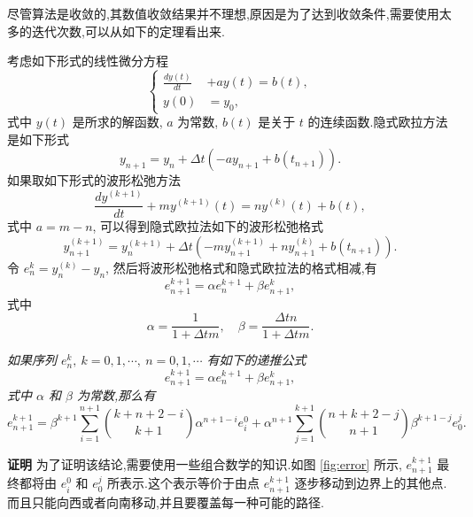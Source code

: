 尽管算法是收敛的,其数值收敛结果并不理想,原因是为了达到收敛条件,需要使用太多的迭代次数,可以从如下的定理看出来.

考虑如下形式的线性微分方程
\begin{equation*}
  \left\{
    \begin{aligned}
      \frac{dy(t)}{dt}&+ay(t)=b(t),\\
      y(0)&=y_{0},
    \end{aligned}
  \right.
\end{equation*}
式中 $y(t)$ 是所求的解函数, $a$ 为常数, $b(t)$ 是关于 $t$ 的连续函数.隐式欧拉方法是如下形式
\begin{equation*}
  y_{n+1}=y_{n}+\Delta t (-a y_{n+1}+b(t_{n+1})).
\end{equation*}
如果取如下形式的波形松弛方法
\begin{equation*}
  \frac{dy^{(k+1)}}{dt}+m y^{(k+1)}(t) = n y^{(k)}(t) + b(t),
\end{equation*}
式中 $a=m-n$, 可以得到隐式欧拉法如下的波形松弛格式
\begin{equation*}
  y_{n+1}^{(k+1)}=y_{n}^{(k+1)}+\Delta t(-m y_{n+1}^{(k+1)}+n y_{n+1}^{(k)} +b(t_{n+1})).
\end{equation*}
令 $e_{n}^{k}=y_{n}^{(k)}-y_{n}$, 然后将波形松弛格式和隐式欧拉法的格式相减,有
\begin{equation*}
  e_{n+1}^{k+1}=\alpha e_{n}^{k+1} + \beta e_{n+1}^{k},
\end{equation*}
式中
\begin{equation*}
  \alpha = \frac{1}{1+\Delta t m}, \quad \beta = \frac{\Delta t n}{1+\Delta t m}.
\end{equation*}

\begin{lemma}\label{lem:error} \emph{如果序列
  $e_{n}^{k},~k =0,1,\cdots,~n=0,1,\cdots$ 有如下的递推公式
  \begin{equation*}
    e_{n+1}^{k+1}=\alpha e_{n}^{k+1} + \beta e_{n+1}^{k},
  \end{equation*}
  式中 $\alpha$ 和 $\beta$ 为常数,那么有
  \begin{equation*}
    e_{n+1}^{k+1}=\beta^{k+1} \sum_{i=1}^{n+1} \binom{k+n+2-i}{k+1} \alpha^{n+1-i}e_{i}^{0} + \alpha^{n+1} \sum_{j=1}^{k+1}\binom{n+k+2-j}{n+1} \beta^{k+1-j}e_{0}^{j}.
  \end{equation*}}
\end{lemma}

{\textbf{证明}} 为了证明该结论,需要使用一些组合数学的知识.如图 \ref{fig:error} 所示, $e_{n+1}^{k+1}$ 最终都将由 $e_{i}^{0}$ 和 $e_{0}^{j}$ 所表示.这个表示等价于由点 $e_{n+1}^{k+1}$ 逐步移动到边界上的其他点.而且只能向西或者向南移动,并且要覆盖每一种可能的路径.

